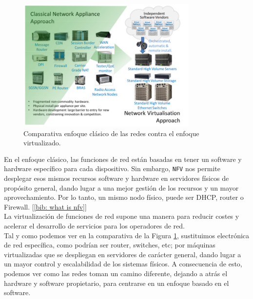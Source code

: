 \documentclass[a4paper, oneside, 12pt]{book}
\begin{document}
	\begin{figure}[h]
		\begin{center}
			\includegraphics[width=0.8\textwidth]{img/classic_network_vs_nfv.png}
			\caption{Comparativa enfoque clásico de las redes contra el enfoque virtualizado.}
			\label{imagen comparativa classic network nfv}
		\end{center}
	\end{figure}
	
	\noindent En el enfoque clásico, las funciones de red están basadas en tener un software y hardware específico para cada dispositivo. Sin embargo, \texttt{NFV} nos permite desplegar esos mismos recursos software y hardware en servidores físicos de propósito general, dando lugar a una mejor gestión de los recursos y un mayor aprovechamiento. Por lo tanto, un mismo nodo físico, puede ser DHCP, router o Firewall. [\ref{bib: what is nfv}]\\
	

	\noindent La virtualización de funciones de red supone una manera para reducir costes y acelerar el desarrollo de servicios para los operadores de red. \\ 
	
	\noindent Tal y como podemos ver en la comparativa de la Figura \ref{imagen comparativa classic network nfv}, sustituimos electrónica de red específica, como podrían ser router, switches, etc; por máquinas virtualizadas que se despliegan en servidores de carácter general, dando lugar a un mayor control y escalabilidad de los sistemas físicos. A consecuencia de esto, podemos ver como las redes toman un camino diferente, dejando a atrás el hardware y software propietario, para centrarse en un enfoque basado en el software. \\
	
\end{document}
